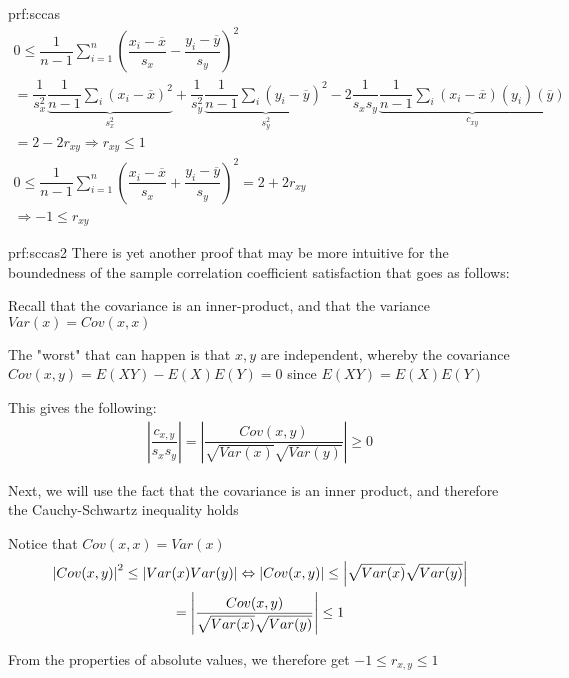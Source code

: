 \newpage
\begin{prf}{prf:sccas}
  \begin{equation*}
    \begin{gathered}
      0\leq \dfrac{1}{n-1}\sum_{i=1}^{n}\left(\dfrac{x_i-\overline{x}}{s_x}-\dfrac{y_i-\overline{y}}{s_y}\right)^2\\
      = \dfrac{1}{s_x^2}\underbrace{\dfrac{1}{n-1}\sum_{i}\left(x_i-\overline{x}\right)^2}_{\text{$s_x^2$}}+\dfrac{1}{s_y^2}\underbrace{\dfrac{1}{n-1}\sum_{i}(y_i-\overline{y})^2}_{\text{$s_y^2$}}-2\dfrac{1}{s_xs_y}\underbrace{\dfrac{1}{n-1}\sum_{i}(x_i-\overline{x})(y_i)(\overline{y})}_{\text{$c_{xy}$}}\\
      = 2-2r_{xy}\Rightarrow r_{xy}\leq1\\
      0\leq\dfrac{1}{n-1}\sum_{i=1}^{n}\left(\dfrac{x_i-\overline{x}}{s_x}+\dfrac{y_i-\overline{y}}{s_y}\right)^2 = 2+2r_{xy}\\
      \Rightarrow -1\leq r_{xy}
    \end{gathered}
  \end{equation*}
\end{prf}
\par\bigskip
\begin{prf}{prf:sccas2}
  There is yet another proof that may be more intuitive for the boundedness of the sample correlation coefficient satisfaction that goes as follows:
  \par\bigskip
  \noindent Recall that the covariance is an inner-product, and that the variance $Var(x) = Cov(x,x)$
  \par\bigskip
  \noindent The "worst" that can happen is that $x,y$ are independent, whereby the covariance $Cov(x,y) = E(XY)-E(X)E(Y) = 0$ since $E(XY) = E(X)E(Y)$
  \par\bigskip
  \noindent This gives the following:
  \begin{equation*}
    \begin{gathered}
      \left|\dfrac{c_{x,y}}{s_xs_y}\right| = \left|\dfrac{Cov(x,y)}{\sqrt{Var(x)}\sqrt{Var(y)}}\right|\geq0
    \end{gathered}
  \end{equation*}
  \par\bigskip
  \noindent Next, we will use the fact that the covariance is an inner product, and therefore the Cauchy-Schwartz inequality holds\par
  \noindent Notice that $Cov(x,x) = Var(x)$
  \begin{equation*}
    \begin{gathered}
      \left|Cov(x,y)\right|^2\leq\left|Var(x)Var(y)\right|\Leftrightarrow \left|Cov(x,y)\right|\leq \left|\sqrt{Var(x)}\sqrt{Var(y)}\right|\\
      = \left|\dfrac{Cov(x,y)}{\sqrt{Var(x)}\sqrt{Var(y)}}\right|\leq 1
    \end{gathered}
  \end{equation*}
  \par\bigskip
  \noindent From the properties of absolute values, we therefore get $-1\leq r_{x,y}\leq 1$ 
\end{prf}
